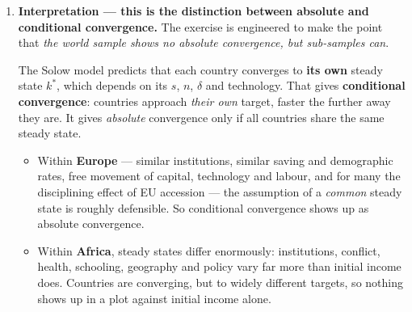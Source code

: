 \documentclass[12pt, letterpaper]{article}
\begin{document}
\begin{tcolorbox}[oddbox,title={Problem 3.3 \quad Within-Region Convergence}]
\begin{enumerate}
\begin{itemize}[leftmargin=1.3em,itemsep=4pt,topsep=2pt]
\item \textbf{Europe converges, and convincingly.} In 1960 Portugal, Spain, Greece and
      Ireland were far poorer than Germany, France and the UK; by 2014 the gap had narrowed
      dramatically. Ireland is the extreme case. Add the post-1990 Eastern European countries
      and the negative slope is stronger still.
\item \textbf{Latin America shows little.} Countries started at broadly similar middle-income
      levels and mostly stayed there --- the region as a whole failed to converge on the US.
      Within-region dispersion did not narrow much; Venezuela moved sharply in the wrong
      direction.
\item \textbf{Africa shows none, and possibly the reverse.} Botswana and Mauritius grew
      rapidly from low bases while Congo, Madagascar, Niger and the Central African Republic
      stagnated or shrank. Initial income predicts almost nothing.
\end{itemize}

\item \textbf{Interpretation --- this is the distinction between absolute and conditional
convergence.} The exercise is engineered to make the point that \emph{the world sample shows
no absolute convergence, but sub-samples can}.

The Solow model predicts that each country converges to \textbf{its own} steady state $k^\ast$,
which depends on its $s$, $n$, $\delta$ and technology. That gives \textbf{conditional
convergence}: countries approach \emph{their own} target, faster the further away they are.
It gives \emph{absolute} convergence only if all countries share the same steady state.

\begin{itemize}[leftmargin=1.3em,itemsep=3pt,topsep=2pt]
\item Within \textbf{Europe} --- similar institutions, similar saving and demographic rates,
      free movement of capital, technology and labour, and for many the disciplining effect
      of EU accession --- the assumption of a \emph{common} steady state is roughly
      defensible. So conditional convergence shows up as absolute convergence.
\item Within \textbf{Africa}, steady states differ enormously: institutions, conflict, health,
      schooling, geography and policy vary far more than initial income does. Countries are
      converging, but to widely different targets, so nothing shows up in a plot against
      initial income alone.
\end{itemize}


\end{enumerate}
\end{tcolorbox}
\end{document}
